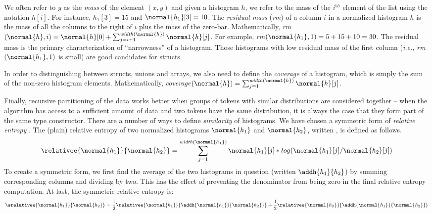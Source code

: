 We often refer to $y$ as the {\em mass} of the element $(x,y)$
and given a histogram $h$, we refer to the mass of the $i^{\mathrm th}$
element of the list 
using the notation $h[i]$.  For instance, $h_1[3] = 15$ and 
$\normal{h_1}[3] = 10$.  The {\em residual mass} ({\em rm}) of a column $i$ in 
a normalized histogram $h$ is the mass of all the columns to the right of 
$i$ plus the mass of the zero-bar.  Mathematically, 
{\em rm}$(\normal{h},i) = \normal{h}[0] + \sum_{j=i+1}^{\mathit{width}(\normal{h})} \normal{h}[j]$.
For example, {\em rm}$(\normal{h_1},1) = 5 + 15 + 10 = 30$.
The residual mass is the primary characterization of ``narrowness''
of a histogram.  Those histograms with low residual mass of the first
column ({\em i.e.,} {\em rm}$(\normal{h_1},1)$ is small) 
are good candidates for structs.

In order to distinguishing between
structs, unions and arrays,
we also need to define the {\em coverage} of a histogram, which
is simply the sum of the non-zero histogram elements.  Mathematically,
{\em coverage}$(\normal{h}) = 
                  \sum_{j=1}^{\mathit{width}(\normal{h})} \normal{h}[j]$.

Finally, recursive partitioning of the data works better when
groups of tokens with similar distributions are considered together
-- when the algorithm has access to a sufficient amount of data and
two tokens have the same distribution, it is always the 
case that they form part of the same type constructor.  There are a 
number of ways to define {\em similarity} of histograms.  We have
chosen a symmetric form of {\em relative entropy} \cite{Lin91:divergence}.
The (plain) relative entropy
of two normalized histograms $\normal{h_1}$ and $\normal{h_2}$, 
written , is
defined as follows.
\[
 \relativee{\normal{h_1}}{\normal{h_2}} 
   = \sum_{j=1}^{\mathit{width}(\normal{h_1})} \normal{h_1}[j]*log(\normal{h_1}[j]/\normal{h_2}[j])
\]
To create a symmetric form, we first find the average of the two
histograms in question (written $\addh{h_1}{h_2}$)
by summing corresponding columns and dividing by two.  This
has the effect of preventing the denominator from being zero in the 
final relative entropy computation.  At last, the symmetric
relative entropy is:
\[
 \srelativee{\normal{h_1}}{\normal{h_2}} 
   = \frac{1}{2}  \relativee{\normal{h_1}}{\addh{\normal{h_1}}{\normal{h_2}}}
   +  \frac{1}{2}  \relativee{\normal{h_2}}{\addh{\normal{h_1}}{\normal{h_2}}}
\]

